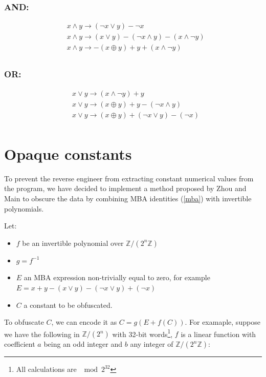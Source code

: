 \documentclass[
  digital, %
  table,   %
  twoside, %
  nolof,     %
  nolot,     %
]{fithesis3}
\theoremstyle{definition}
\begin{document}
\subsubsection{AND:}
$$
\begin{aligned}
&x \wedge y \rightarrow (\neg x \vee y) - \neg x  \\
&x \wedge y \rightarrow(x \vee y)-(\neg x \wedge y)-(x \wedge \neg y) \\
&x \wedge y \rightarrow-(x \oplus y)+y+(x \wedge \neg y) \\
\end{aligned}
$$

\subsubsection{OR:}
$$
\begin{aligned}
&x \vee y \rightarrow(x \wedge \neg y) + y\\
&x \vee y \rightarrow(x \oplus y)+y-(\neg x \wedge y) \\
&x \vee y \rightarrow(x \oplus y)+(\neg x \vee y)-(\neg x) \\
\end{aligned}
$$

\section{Opaque constants} \label{obf_const}

To prevent the reverse engineer from extracting constant numerical values from the program, we have decided to implement a method proposed by Zhou and Main \cite{mba_zhou} to obscure the data by combining MBA identities (\ref{mba}) with invertible polynomials. 

Let:

\begin{itemize}
    \item $f$ be an invertible polynomial over $\mathbb{Z}/(2^n\mathbb{Z})$
    \item $g = f^{-1}$
    \item $E$ an MBA expression non-trivially equal to zero, for example $E = x + y - (x \vee y)-(\neg x \vee y)+(\neg x)$
    \item $C$ a constant to be obfuscated.
\end{itemize}

To obfuscate $C$, we can encode it as $C = g(E + f(C))$. For examaple, suppose we have the following in $\mathbb{Z}/(2^n)$ with 32-bit words\footnote{All calculations are $\mod 2^{32}$}, $f$ is a linear function with coefficient $a$ being an odd integer and $b$ any integer of $\mathbb{Z}/(2^n\mathbb{Z})$:
\end{document}
